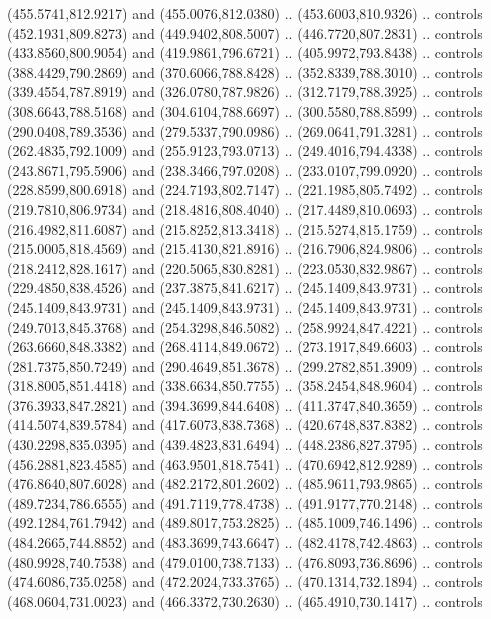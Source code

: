 \begin{scope}[shift={(-162.56685,-567.58888)}]
\begin{scope}
      (455.5741,812.9217) and (455.0076,812.0380) .. (453.6003,810.9326) .. controls
      (452.1931,809.8273) and (449.9402,808.5007) .. (446.7720,807.2831) .. controls
      (433.8560,800.9054) and (419.9861,796.6721) .. (405.9972,793.8438) .. controls
      (388.4429,790.2869) and (370.6066,788.8428) .. (352.8339,788.3010) .. controls
      (339.4554,787.8919) and (326.0780,787.9826) .. (312.7179,788.3925) .. controls
      (308.6643,788.5168) and (304.6104,788.6697) .. (300.5580,788.8599) .. controls
      (290.0408,789.3536) and (279.5337,790.0986) .. (269.0641,791.3281) .. controls
      (262.4835,792.1009) and (255.9123,793.0713) .. (249.4016,794.4338) .. controls
      (243.8671,795.5906) and (238.3466,797.0208) .. (233.0107,799.0920) .. controls
      (228.8599,800.6918) and (224.7193,802.7147) .. (221.1985,805.7492) .. controls
      (219.7810,806.9734) and (218.4816,808.4040) .. (217.4489,810.0693) .. controls
      (216.4982,811.6087) and (215.8252,813.3418) .. (215.5274,815.1759) .. controls
      (215.0005,818.4569) and (215.4130,821.8916) .. (216.7906,824.9806) .. controls
      (218.2412,828.1617) and (220.5065,830.8281) .. (223.0530,832.9867) .. controls
      (229.4850,838.4526) and (237.3875,841.6217) .. (245.1409,843.9731) .. controls
      (245.1409,843.9731) and (245.1409,843.9731) .. (245.1409,843.9731) .. controls
      (249.7013,845.3768) and (254.3298,846.5082) .. (258.9924,847.4221) .. controls
      (263.6660,848.3382) and (268.4114,849.0672) .. (273.1917,849.6603) .. controls
      (281.7375,850.7249) and (290.4649,851.3678) .. (299.2782,851.3909) .. controls
      (318.8005,851.4418) and (338.6634,850.7755) .. (358.2454,848.9604) .. controls
      (376.3933,847.2821) and (394.3699,844.6408) .. (411.3747,840.3659) .. controls
      (414.5074,839.5784) and (417.6073,838.7368) .. (420.6748,837.8382) .. controls
      (430.2298,835.0395) and (439.4823,831.6494) .. (448.2386,827.3795) .. controls
      (456.2881,823.4585) and (463.9501,818.7541) .. (470.6942,812.9289) .. controls
      (476.8640,807.6028) and (482.2172,801.2602) .. (485.9611,793.9865) .. controls
      (489.7234,786.6555) and (491.7119,778.4738) .. (491.9177,770.2148) .. controls
      (492.1284,761.7942) and (489.8017,753.2825) .. (485.1009,746.1496) .. controls
      (484.2665,744.8852) and (483.3699,743.6647) .. (482.4178,742.4863) .. controls
      (480.9928,740.7538) and (479.0100,738.7133) .. (476.8093,736.8696) .. controls
      (474.6086,735.0258) and (472.2024,733.3765) .. (470.1314,732.1894) .. controls
      (468.0604,731.0023) and (466.3372,730.2630) .. (465.4910,730.1417) .. controls

\end{scope}
\end{scope}
